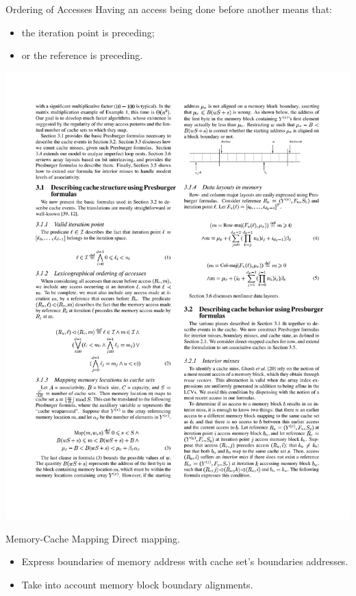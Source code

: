 \documentclass{beamer}
\begin{document}
\begin{frame}{Ordering of Accesses}
  Having an access being done before another means that:
  \begin{itemize}[<+->]
    \item the iteration point is preceding;
    \item or the reference is preceding.
  \end{itemize}
  \begin{center}
    \includegraphics[scale=1.1]{eq2}
  \end{center}
\end{frame}

\begin{frame}{Memory-Cache Mapping}
  Direct mapping.
  \begin{itemize}
    \item Express boundaries of memory address with cache set's boundaries addresses.
    \item Take into account memory block boundary alignments.
  \end{itemize}
\end{frame}
\end{document}
